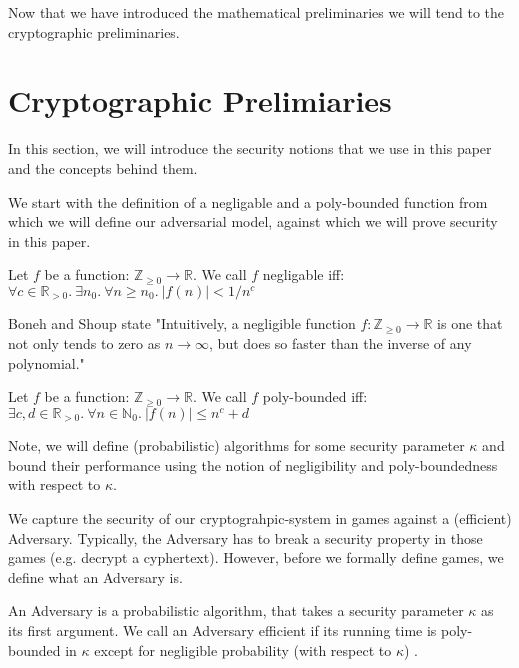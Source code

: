 Now that we have introduced the mathematical preliminaries we will tend to the cryptographic preliminaries. 

\section{Cryptographic Prelimiaries}
In this section, we will introduce the security notions that we use in this paper and the concepts behind them.

We start with the definition of a negligable and a poly-bounded function from which we will define our adversarial model, against which we will prove security in this paper.

\begin{definition}
    Let $f$ be a function: $\mathbb{Z}_{\ge 0} \rightarrow \mathbb{R}$. We call $f$ negligable iff:
    $\forall c \in \mathbb{R}_{> 0}. \ \exists n_0. \ \forall n \ge n_0. \ \vert f(n)\vert < 1/n^c$
    
    \parencite{boneh_shoup}
\end{definition}
Boneh and Shoup state "Intuitively, a negligible function $f:\mathbb{Z}_{\ge 0} \rightarrow \mathbb{R}$ is one that not only tends to zero as $n \rightarrow \infty$, but
does so faster than the inverse of any polynomial." \parencite{boneh_shoup}

\begin{definition}
    Let $f$ be a function: $\mathbb{Z}_{\ge 0} \rightarrow \mathbb{R}$. We call $f$ poly-bounded iff:
    $\exists c,d \in \mathbb{R}_{>0}. \ \forall n \in \mathbb{N}_0. \ \vert f(n)\vert \le n^c+d$

    \parencite{boneh_shoup}
\end{definition}


Note, we will define (probabilistic) algorithms for some security parameter $\kappa$ and bound their performance using the notion of negligibility and poly-boundedness with respect to $\kappa$.

We capture the security of our cryptograhpic-system in games against a (efficient) Adversary. Typically, the Adversary has to break a security property in those games (e.g. decrypt a cyphertext). However, before we formally define games, we define what an Adversary is.

\begin{definition}
    \label{Adversary}
An Adversary is a probabilistic algorithm, that takes a security parameter $\kappa$ as its first argument. 
We call an Adversary efficient if its running time is poly-bounded in $\kappa$ except for negligible probability (with respect to $\kappa$)
\parencite{boneh_shoup}.
\end{definition}

